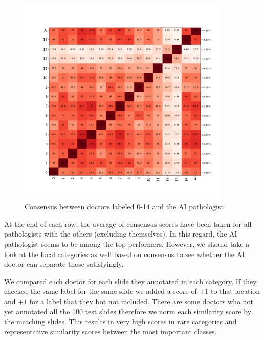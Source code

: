 \documentclass[a4paper,12pt]{article}
\begin{document}
\begin{figure}[H]
    \centering
    \includegraphics[width=0.9\textwidth]{results/consensus.png}
    \caption{Consensus between doctors labeled 0-14 and the AI pathologist}
    \label{fig:my_label}
\end{figure}

\vspace{4mm}

\par At the end of each row, the average of consensus scores have been taken for all pathologists with the others (excluding themselves). In this regard, the AI pathologist seems to be among the top performers. However, we should take a look at the local categories as well based on consensus to see whether the AI doctor can separate those satisfyingly.

\vspace{4mm}

\par We compared each doctor for each slide they annotated in each category. If they checked the same label for the same slide we added a score of $+1$ to that location and $+1$ for a label that they bot not included. There are some doctors who not yet annotated all the 100 test slides therefore we norm each similarity score by the matching slides. This results in very high scores in rare categories and representative similarity scores between the most important classes.
\end{document}
